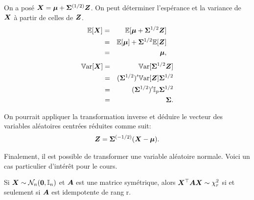 \begin{remarque}
   On a posé $\bm{X}=\bm{\mu} + \bm{\Sigma}^{(1/2)}\bm{Z}$. 
On peut déterminer l'espérance et la variance de $\bm{X}$ à partir de celles de $\bm{Z}$.
\begin{eqnarray*}
	\mathbb{E}[\bm{X}] &=& \mathbb{E}[\bm{\mu} + \bm{\Sigma}^{1/2}\bm{Z}]\\
	& =& \mathbb{E}[\bm{\mu}]+ \bm{\Sigma}^{1/2}\mathbb{E}[\bm{Z}] \\
	&=& \bm{\mu},
\end{eqnarray*}
\begin{eqnarray*}
	\mathbb{V}\text{ar}[\bm{X}] &=& \mathbb{V}\text{ar}[\bm{\Sigma}^{1/2}\bm{Z}] \\
	& = & (\bm{\Sigma}^{1/2})' \mathbb{V}\text{ar}[\bm{Z}] \bm{\Sigma}^{1/2} \\
	&=& (\bm{\Sigma}^{1/2})' \bm{\mathbb{I}}_p \bm{\Sigma}^{1/2} \\
	&=& \bm{\Sigma}.
\end{eqnarray*} 
\end{remarque}

\begin{remarque}
    On pourrait appliquer la transformation inverse et déduire le vecteur des variables aléatoires centrées réduites  comme suit: $$\bm{Z} =  \bm{\Sigma}^{(-1/2)} (\bm{X}-\bm{\mu}).$$
\end{remarque}

Finalement, il est possible de transformer une variable aléatoire normale. Voici un cas particulier d'intérêt pour le cours.

\begin{theorem}
\label{thmNormalChi2}
Si $\bm{X} \sim \mathcal{N}_n(\bm{0},\bm{\mathbb{I}}_n)$ et $\bm{A}$ est une matrice symétrique, alors $\bm{X}^\top\bm{A}\bm{X} \sim \chi^2_r$ si et seulement si $\bm{A}$ est idempotente de rang r.
\end{theorem}
